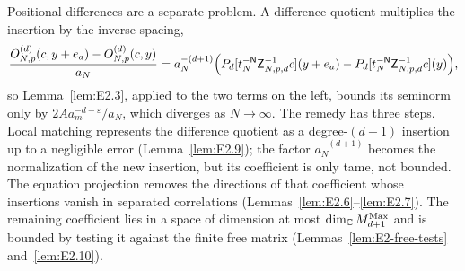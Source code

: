 Positional differences are a separate problem. A difference quotient multiplies the insertion by the inverse spacing,
\begin{equation}\label{eq:E-inverse-spacing}
\frac{O^{(d)}_{N,p}(c,y+e_a)-O^{(d)}_{N,p}(c,y)}{a_N}
=a_N^{-(d+1)}\Bigl(P_d[t_N^{-\mathsf{N}}\mathsf Z_{N,p,d}^{-1}c](y+e_a)
-P_d[t_N^{-\mathsf{N}}\mathsf Z_{N,p,d}^{-1}c](y)\Bigr),
\end{equation}
so Lemma~\ref{lem:E2.3}, applied to the two terms on the left, bounds its seminorm only by $2Aa_m^{-d-\varepsilon}/a_N$, which diverges as $N\to\infty$. The remedy has three steps. Local matching represents the difference quotient as a degree-$(d+1)$ insertion up to a negligible error (Lemma~\ref{lem:E2.9}); the factor $a_N^{-(d+1)}$ becomes the normalization of the new insertion, but its coefficient is only tame, not bounded. The equation projection removes the directions of that coefficient whose insertions vanish in separated correlations (Lemmas~\ref{lem:E2.6}--\ref{lem:E2.7}). The remaining coefficient lies in a space of dimension at most $\dim_{\mathbb{C}}M_{d+1}^{\mathrm{Max}}$ and is bounded by testing it against the finite free matrix (Lemmas~\ref{lem:E2-free-tests} and~\ref{lem:E2.10}).

